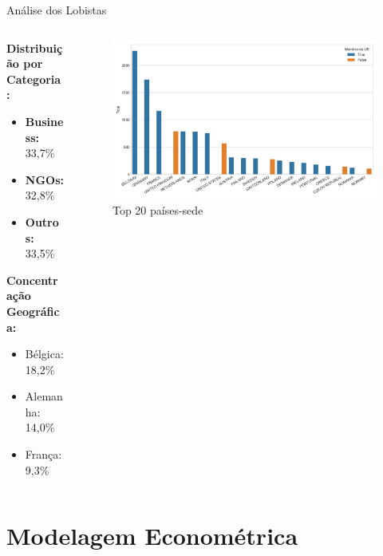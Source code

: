 \documentclass[aspectratio=169]{beamer}
\begin{document}
\begin{frame}{Análise dos Lobistas}
\begin{columns}
\begin{column}{0.5\textwidth}
\textbf{Distribuição por Categoria:}
\begin{itemize}
\item \textbf{Business:} 33,7\%
\item \textbf{NGOs:} 32,8\%
\item \textbf{Outros:} 33,5\%
\end{itemize}

\textbf{Concentração Geográfica:}
\begin{itemize}
\item Bélgica: 18,2\%
\item Alemanha: 14,0\%
\item França: 9,3\%
\end{itemize}
\end{column}
\begin{column}{0.5\textwidth}
\begin{figure}
\centering
\includegraphics[width=\textwidth]{figures/country_distribution_top20.png}
\caption{Top 20 países-sede}
\end{figure}
\end{column}
\end{columns}
\end{frame}


\section{Modelagem Econométrica}
\end{document}
